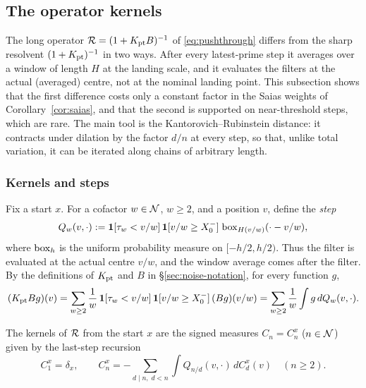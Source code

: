 \subsection{The operator kernels}\label{sec:kernels}

The long operator $\mathcal{R}=(1+K_{\mathrm{pt}} B)^{-1}$ of \eqref{eq:pushthrough} differs from the sharp resolvent $(1+K_{\mathrm{pt}})^{-1}$ in two
ways. After every latest-prime step it averages over a window of length $H$ at the landing scale, and it evaluates the
filters at the actual (averaged) centre, not at the nominal landing point. This subsection shows that the first
difference costs only a constant factor in the Saias weights of Corollary~\ref{cor:saias}, and that the second is
supported on near-threshold steps, which are rare. The main tool is the Kantorovich--Rubinstein distance: it contracts
under dilation by the factor $d/n$ at every step, so that, unlike total variation, it can be iterated along chains of
arbitrary length.

\subsubsection{Kernels and steps}\label{sec:kernels-steps}

Fix a start $x$. For a cofactor $w\in\mathcal{N}$, $w\ge2$, and a position $v$, define the \emph{step}
\begin{equation}\label{eq:step}
  Q_w(v,\cdot):=\mathbf 1[\tau_w<v/w]\,\mathbf 1[v/w\ge X_0^{-}]\;\mathrm{box}_{H(v/w)}(\cdot-v/w),
\end{equation}
where $\mathrm{box}_h$ is the uniform probability measure on $[-h/2,h/2)$. Thus the filter is evaluated at the actual centre
$v/w$, and the window average comes after the filter. By the definitions of $K_{\mathrm{pt}}$ and $B$ in
\S\ref{sec:noise-notation}, for every function $g$,
\[
  (K_{\mathrm{pt}} Bg)(v)=\sum_{w\ge2}\frac1w\,\mathbf 1[\tau_w<v/w]\,\mathbf 1[v/w\ge X_0^{-}]\,(Bg)(v/w)=\sum_{w\ge2}\frac1w\int g\,dQ_w(v,\cdot).
\]

\begin{definition}[Kernels]\label{def:kernels}
The kernels of $\mathcal{R}$ from the start $x$ are the signed measures $C_n=C_n^x$ ($n\in\mathcal{N}$) given by the last-step recursion
\begin{equation}\label{eq:kernel-rec}
  C_1^x=\delta_x,\qquad C_n^x=-\sum_{d\mid n,\;d<n}\int Q_{n/d}(v,\cdot)\,dC_d^x(v)\quad(n\ge2).
\end{equation}
\end{definition}

